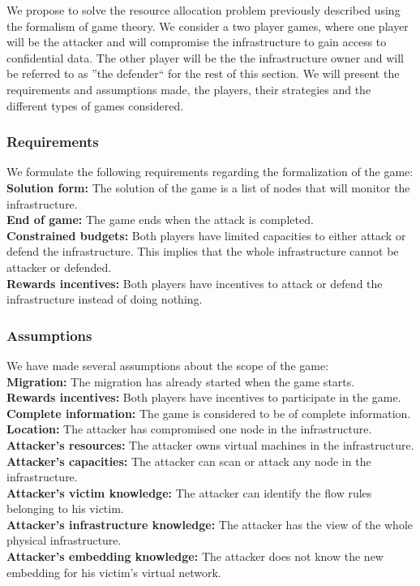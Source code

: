 We propose to solve the resource allocation problem previously described using the formalism of game theory.
We consider a two player games, where one player will be the attacker and will compromise the infrastructure to gain access to confidential data. The other player will be the the infrastructure owner and will be referred to as ''the defender`` for the rest of this section.
We will present the requirements and assumptions made, the players, their strategies and the different types of games considered.

\subsubsection{Requirements}
We formulate the following requirements regarding the formalization of the game:\\
\textbf{Solution form: } The solution of the game is a list of nodes that will monitor the infrastructure.\\
\textbf{End of game: } The game ends when the attack is completed.\\
\textbf{Constrained budgets: } Both players have limited capacities to either attack or defend the infrastructure.
This implies that the whole infrastructure cannot be attacker or defended.\\
\textbf{Rewards incentives: } Both players have incentives to attack or defend the infrastructure instead of doing nothing.\\

\subsubsection{Assumptions}
We have made several assumptions about the scope of the game:\\
\textbf{Migration: } The migration has already started when the game starts.\\
\textbf{Rewards incentives: } Both players have incentives to participate in the game.\\
\textbf{Complete information: } The game is considered to be of complete information.\\
\textbf{Location: } The attacker has compromised one node in the infrastructure.\\
\textbf{Attacker's resources: } The attacker owns virtual machines in the infrastructure.\\
\textbf{Attacker's capacities: } The attacker can scan or attack any node in the infrastructure.\\
\textbf{Attacker's victim knowledge: } The attacker can identify the flow rules belonging to his victim.\\
\textbf{Attacker's infrastructure knowledge: } The attacker has the view of the whole physical infrastructure.\\
\textbf{Attacker's embedding knowledge: } The attacker does not know the new embedding for his victim's virtual network.
    

